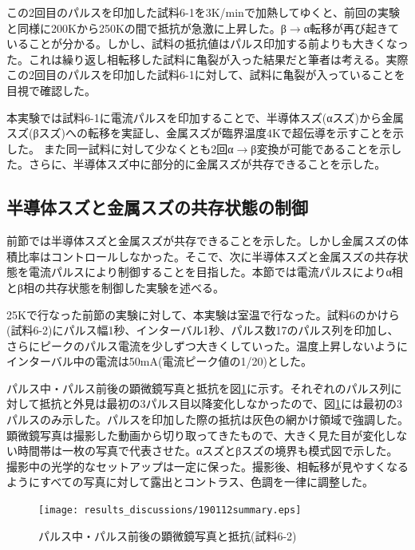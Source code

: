 この2回目のパルスを印加した試料6-1を3K/minで加熱してゆくと、前回の実験と同様に200Kから250Kの間で抵抗が急激に上昇した。β$\to$α転移が再び起きていることが分かる。しかし、試料の抵抗値はパルス印加する前よりも大きくなった。これは繰り返し相転移した試料に亀裂が入った結果だと筆者は考える。実際この2回目のパルスを印加した試料6-1に対して、試料に亀裂が入っていることを目視で確認した。

本実験では試料6-1に電流パルスを印加することで、半導体スズ(αスズ)から金属スズ(βスズ)への転移を実証し、金属スズが臨界温度4Kで超伝導を示すことを示した。
また同一試料に対して少なくとも2回α$\to$β変換が可能であることを示した。さらに、半導体スズ中に部分的に金属スズが共存できることを示した。

\subsection{半導体スズと金属スズの共存状態の制御}
前節では半導体スズと金属スズが共存できることを示した。しかし金属スズの体積比率はコントロールしなかった。そこで、次に半導体スズと金属スズの共存状態を電流パルスにより制御することを目指した。本節では電流パルスによりα相とβ相の共存状態を制御した実験を述べる。

25Kで行なった前節の実験に対して、本実験は室温で行なった。試料6のかけら(試料6-2)にパルス幅1秒、インターバル1秒、パルス数17のパルス列を印加し、さらにピークのパルス電流を少しずつ大きくしていった。温度上昇しないようにインターバル中の電流は50mA(電流ピーク値の1/20)とした。

パルス中・パルス前後の顕微鏡写真と抵抗を図\ref{fig:190112summary}に示す。それぞれのパルス列に対して抵抗と外見は最初の3パルス目以降変化しなかったので、図\ref{fig:190112summary}には最初の3パルスのみ示した。パルスを印加した際の抵抗は灰色の網かけ領域で強調した。顕微鏡写真は撮影した動画から切り取ってきたもので、大きく見た目が変化しない時間帯は一枚の写真で代表させた。αスズとβスズの境界も模式図で示した。撮影中の光学的なセットアップは一定に保った。撮影後、相転移が見やすくなるようにすべての写真に対して露出とコントラス、色調を一律に調整した。
\begin{landscape}
\begin{figure}[!h]
    \begin{center}
   \texttt{[image: results\_discussions/190112summary.eps]}
  \end{center}
    \caption{パルス中・パルス前後の顕微鏡写真と抵抗(試料6-2)}
  \label{fig:190112summary}
\end{figure}
\end{landscape}

